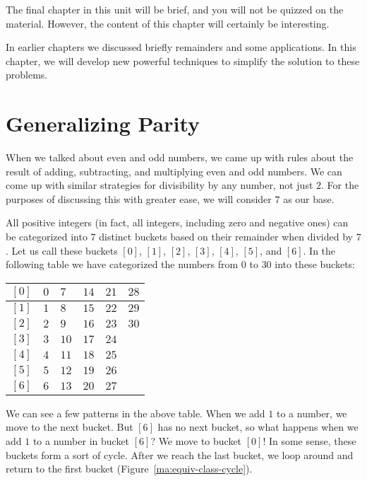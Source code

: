 \documentclass[a4paper,10pt]{report}
\begin{document}
The final chapter in this unit will be brief, and you will not be quizzed on
the material. However, the content of this chapter will certainly be
interesting.

In earlier chapters we discussed briefly remainders and some applications. In
this chapter, we will develop new powerful techniques to simplify the solution
to these problems.

\section{Generalizing Parity}

When we talked about even and odd numbers, we came up with rules about the
result of adding, subtracting, and multiplying even and odd numbers. We can
come up with similar strategies for divisibility by any number, not just \(2\).
For the purposes of discussing this with greater ease, we will consider \(7\)
as our base.

All positive integers (in fact, all integers, including zero and negative ones)
can be categorized into \(7\) distinct buckets based on their remainder when
divided by \(7\). Let us call these buckets \([0]\), \([1]\), \([2]\), \([3]\),
\([4]\), \([5]\), and \([6]\). In the following table we have categorized the
numbers from \(0\) to \(30\) into these buckets:

\begin{center}
 \begin{tabular}{|c|lllll|}
  \hline
  \([0]\) & \(0\) & \(7\) & \(14\) & \(21\) & \(28\) \\ \hline
  \([1]\) & \(1\) & \(8\) & \(15\) & \(22\) & \(29\) \\ \hline
  \([2]\) & \(2\) & \(9\) & \(16\) & \(23\) & \(30\) \\ \hline
  \([3]\) & \(3\) & \(10\) & \(17\) & \(24\) & \\ \hline
  \([4]\) & \(4\) & \(11\) & \(18\) & \(25\) & \\ \hline
  \([5]\) & \(5\) & \(12\) & \(19\) & \(26\) & \\ \hline
  \([6]\) & \(6\) & \(13\) & \(20\) & \(27\) & \\ \hline
 \end{tabular}
\end{center}

We can see a few patterns in the above table. When we add \(1\) to a number, we
move to the next bucket. But \([6]\) has no next bucket, so what happens when
we add \(1\) to a number in bucket \([6]\)? We move to bucket \([0]\)! In some
sense, these buckets form a sort of cycle. After we reach the last bucket, we
loop around and return to the first bucket (Figure~\ref{ma:equiv-class-cycle}).
\end{document}
